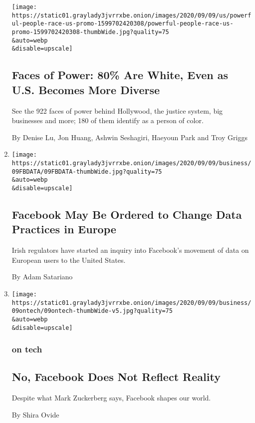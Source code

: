 \begin{enumerate}
  \texttt{[image: https://static01.graylady3jvrrxbe.onion/images/2020/09/09/us/powerful-people-race-us-promo-1599702420308/powerful-people-race-us-promo-1599702420308-thumbWide.jpg?quality=75\\\&auto=webp\\\&disable=upscale]}

  \hypertarget{faces-of-power-80-are-white-even-as-us-becomes-more-diverse}{%
  \subsection{Faces of Power: 80\% Are White, Even as U.S. Becomes More
  Diverse}\label{faces-of-power-80-are-white-even-as-us-becomes-more-diverse}}

  See the 922 faces of power behind Hollywood, the justice system, big
  businesses and more; 180 of them identify as a person of color.

  By Denise Lu, Jon Huang, Ashwin Seshagiri, Haeyoun Park and Troy
  Griggs
\item
  \href{/2020/09/09/technology/facebook-european-union-data-privacy.html}{}

  \texttt{[image: https://static01.graylady3jvrrxbe.onion/images/2020/09/09/business/09FBDATA/09FBDATA-thumbWide.jpg?quality=75\\\&auto=webp\\\&disable=upscale]}

  \hypertarget{facebook-may-be-ordered-to-change-data-practices-in-europe}{%
  \subsection{Facebook May Be Ordered to Change Data Practices in
  Europe}\label{facebook-may-be-ordered-to-change-data-practices-in-europe}}

  Irish regulators have started an inquiry into Facebook's movement of
  data on European users to the United States.

  By Adam Satariano
\item
  \href{/2020/09/09/technology/facebook-mark-zuckerberg.html}{}

  \texttt{[image: https://static01.graylady3jvrrxbe.onion/images/2020/09/09/business/09ontech/09ontech-thumbWide-v5.jpg?quality=75\\\&auto=webp\\\&disable=upscale]}

  \hypertarget{on-tech-2}{%
  \subsubsection{on tech}\label{on-tech-2}}

  \hypertarget{no-facebook-does-not-reflect-reality}{%
  \subsection{No, Facebook Does Not Reflect
  Reality}\label{no-facebook-does-not-reflect-reality}}

  Despite what Mark Zuckerberg says, Facebook shapes our world.

  By Shira Ovide
\end{enumerate}

